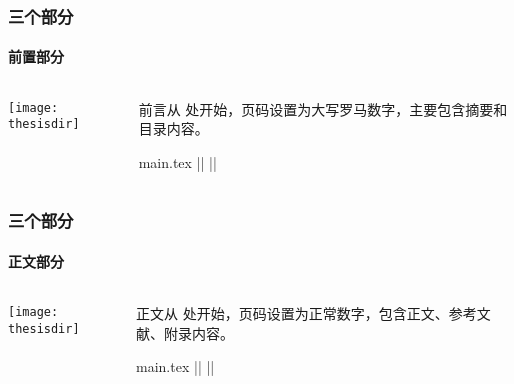 \begin{frame}[fragile]
  \frametitle{三个部分}
  \framesubtitle{前置部分}
  \begin{columns}
    \begin{column}{0.4\textwidth}
      \texttt{[image: thesisdir]}
    \end{column}
    \begin{column}{0.6\textwidth}
      前言从  处开始，页码设置为大写罗马数字，主要包含摘要和目录内容。
      \begin{codeblock}[firstnumber=27]{main.tex}
|\highlightline|%
|\highlightline|\frontmatter



\tableofcontents
      \end{codeblock}
    \end{column}
  \end{columns}
\end{frame}

\begin{frame}[fragile]
  \frametitle{三个部分}
  \framesubtitle{正文部分}
  \begin{columns}
    \begin{column}{0.4\textwidth}
      \texttt{[image: thesisdir]}
    \end{column}
    \begin{column}{0.6\textwidth}
      正文从  处开始，页码设置为正常数字，包含正文、参考文献、附录内容。
      \begin{codeblock}[firstnumber=47]{main.tex}
|\highlightline|%
|\highlightline|\mainmatter







\printbibliography[heading=bibintoc]

\appendix
      \end{codeblock}
    \end{column}
  \end{columns}
\end{frame}

